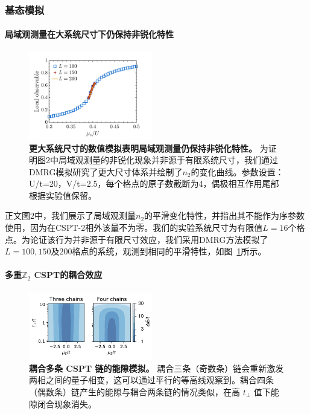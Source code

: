 \documentclass[preprint,superscriptaddress,floatfix,nofootinbib]{revtex4-2}
\begin{document}
\subsubsection*{基态模拟}

\paragraph*{局域观测量在大系统尺寸下仍保持非锐化特性}

\begin{figure}
    \centering
    \includegraphics[width=0.48\textwidth]{figures/large_size_local_observable.pdf}
    \caption{\textbf{更大系统尺寸的数值模拟表明局域观测量仍保持非锐化特性。} 为证明图2中局域观测量的非锐化现象并非源于有限系统尺寸，我们通过DMRG模拟研究了更大尺寸体系并绘制了$n_2$的变化曲线。参数设置：U/t=20，V/t=2.5，每个格点的原子数截断为4，偶极相互作用尾部根据实验值保留。}
    \label{fig: large_size_local_observable}
\end{figure}

正文图2中，我们展示了局域观测量$n_2$的平滑变化特性，并指出其不能作为序参数使用，因为在CSPT-2相外该量不为零。我们的实验系统尺寸为有限值$L=16$个格点。为论证该行为并非源于有限尺寸效应，我们采用DMRG方法模拟了$L=100, 150$及$200$格点的系统，观测到相同的平滑特性，如图~\ref{fig: large_size_local_observable}所示。

\paragraph*{多重$\mathbb{Z}_2$ CSPT的耦合效应}

\begin{figure}
    \centering
    \includegraphics[width=0.48\textwidth]{figures/three_or_more_coupled_chains.pdf}
    \caption{\textbf{耦合多条 CSPT 链的能隙模拟。} 耦合三条（奇数条）链会重新激发两相之间的量子相变，这可以通过平行的等高线观察到。耦合四条（偶数条）链产生的能隙与耦合两条链的情况类似，在高 $t_\perp$ 值下能隙闭合现象消失。
    }
    \label{fig: three_or_more_coupled_chains}
\end{figure}
\end{document}
